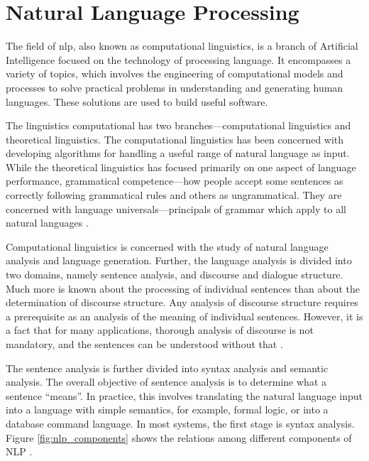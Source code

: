 \section{Natural Language Processing}\label{sec:nlp}

The field of \gls{nlp}, also known as computational linguistics, is a branch of Artificial Intelligence focused on the technology of processing language.
It encompasses a variety of topics, which involves the engineering of computational models and
processes to solve practical problems in understanding and generating human
languages. These solutions are used to build useful software.

The linguistics computational has two
branches---computational linguistics and theoretical linguistics. The computational
linguistics has been concerned with developing algorithms for handling a useful
range of natural language as input. While the theoretical linguistics has focused
primarily on one aspect of language performance, grammatical competence---how
people accept some sentences as correctly following grammatical rules and others as ungrammatical. They are concerned with language universals—principals of
grammar which apply to all natural languages \cite{Cole:1996}.

Computational linguistics is concerned with the study of natural language analysis
and language generation. Further, the language analysis is divided into two domains,
namely sentence analysis, and discourse and dialogue structure. Much more is known
about the processing of individual sentences than about the determination of discourse
structure. Any analysis of discourse structure requires a prerequisite as an analysis of
the meaning of individual sentences. However, it is a fact that for many applications,
thorough analysis of discourse is not mandatory, and the sentences can be understood
without that \cite{grishman_computational_1986}.

The sentence analysis is further divided into syntax analysis and semantic analysis.
The overall objective of sentence analysis is to determine what a sentence “means”.
In practice, this involves translating the natural language input into a language with
simple semantics, for example, formal logic, or into a database command language.
In most systems, the first stage is syntax analysis. Figure \ref*{fig:nlp_components} shows the relations
among different components of NLP \cite{Chowdhary2020}.

